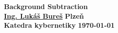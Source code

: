 \documentclass[12pt, a4paper]{article}
\begin{document}
\begin{titlepage}
\begin{center}
	\vspace*{\fill}
	\textbf{\Huge{Background Subtraction}}\\
	\vspace*{\fill}
	\textbf{\large{\href{mailto:LBures@kky.zcu.cz}{Ing. Lukáš Bureš}}} \hfill \textbf{\large{Plzeň}}\\
	\textbf{\large{Katedra kybernetiky}} \hfill \textbf{\large{\today}}
\end{center}
\end{titlepage}






\newpage




\end{document}
